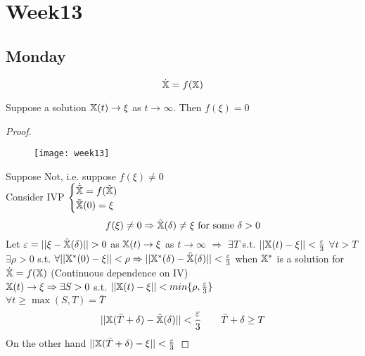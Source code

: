 \chapter{Week13}

\section{Monday}
\[\dot{\mathbb{X}}=f(\mathbb{X})
\]
\begin{proposition}
Suppose a solution $\mathbb{X}(t)\rightarrow \xi$ as $t\rightarrow\infty$. Then $f(\xi)=0$
\end{proposition}
\begin{proof}
\begin{figure}[H]
\centering
\texttt{[image: week13]}
\end{figure}
Suppose Not, i.e. suppose $f(\xi)\neq0$\\
Consider IVP $\begin{cases}\dot{\tilde{\mathbb{X}}}=f(\tilde{\mathbb{X}})\\\tilde{\mathbb{X}}(0)=\xi\end{cases}$
\[f(\xi)\neq0\Rightarrow\tilde{\mathbb{X}}(\delta)\neq\xi \text{ for some } \delta>0
\]
Let $\varepsilon=||\xi-\tilde{\X}(\delta)||>0$ as $\mathbb{X}(t)\rightarrow\xi$ as $t\rightarrow\infty$
$\Rightarrow$ $\exists T$ s.t. $||\mathbb{X}(t)-\xi||<\frac{\varepsilon}{3}$ $\forall t>T$\\
$\exists \rho>0$ s.t. $\forall ||\mathbb{X}^*(0)-\xi||<\rho \Rightarrow ||\mathbb{X}^*(\delta)-\tilde{\mathbb{X}}(\delta)||<\frac{\varepsilon}{3}$ when $\mathbb{X}^*$ is a solution for $\dot{\mathbb{X}}=f(\mathbb{X})$ (Continuous dependence on IV) \\
$\mathbb{X}(t)\rightarrow\xi\Rightarrow\exists S>0$ s.t. $||\mathbb{X}(t)-\xi||<min\{\rho,\frac{\varepsilon}{3}\}$\\
$\forall t\geq\max(S,T)=\bar{T}$
\[||\mathbb{X}(\bar{T}+\delta)-\tilde{\mathbb{X}}(\delta)||<\frac{\varepsilon}{3}\qquad\bar{T}+\delta\geq T
\]
On the other hand $||\mathbb{X}(\bar{T}+\delta)-\xi||<\frac{\varepsilon}{3}$
\end{proof}
